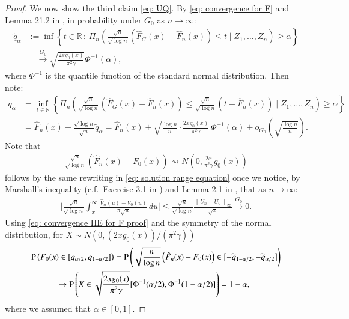 \begin{proof}
		We now show the third claim \eqref{eq: UQ}. By \eqref{eq: convergence for F} and Lemma 21.2 in \cite{6}, in probability under $G_0$ as $n \rightarrow \infty$:
	\begin{align*}
		\widetilde{q}_{\alpha} &:= \inf \left\{ t \in \mathbb{R} \, : \, \Pi_n \left( \frac{\sqrt{n}}{\sqrt{\log n}}\left(\hat{F}_{\scriptscriptstyle{G}}(x)-\hat{F}_n(x)\right) \leq t \mid Z_1, \ldots, Z_n \right) \geq \alpha \right\} \\
		&\quad \stackrel{G_0}{\longrightarrow} \sqrt{\frac{2 x g_0(x)}{\pi^2 \gamma}} \Phi^{-1}(\alpha), 
	\end{align*}
	where $\Phi^{-1}$ is the quantile function of the standard normal distribution. Then note:
	\begin{align*}
		q_{\alpha} &= \inf_{t \in \mathbb{R}} \left\{  \Pi_n \left( \frac{\sqrt{n}}{\sqrt{\log n}}\left(\hat{F}_{\scriptscriptstyle{G}}(x)-\hat{F}_n(x)\right) \leq \frac{\sqrt{n}}{\sqrt{\log n}} \left( t - \hat{F}_n(x) \right)\mid Z_1, \ldots, Z_n \right) \geq \alpha \right\} \\
		&= \hat{F}_n(x) + \frac{\sqrt{\log n}}{\sqrt{n}} \widetilde{q}_{\alpha} = \hat{F}_n(x) +  \sqrt{\frac{\log{n}}{n} \cdot \frac{2 x g_0(x)}{\pi^2 \gamma} } \, \Phi^{-1}(\alpha) + o_{\scriptscriptstyle{G_0}}\left(\sqrt{\frac{\log n}{n}}\right).
	\end{align*}
	 Note that
    \begin{align}\label{eq: convergence IIE for F proof}
	\frac{\sqrt{n}}{\sqrt{\log n}}\left(\hat{F}_n(x) - F_0(x)\right) \rightsquigarrow N\left(0, \frac{2 x}{\pi^2 \gamma} g_0(x)\right)
    \end{align}
    follows by the same rewriting in \eqref{eq: solution range equation} once we notice, by Marshall's inequality (c.f.\ Exercise 3.1 in \cite{2}) and Lemma 2.1 in \cite{27}, that as $n \rightarrow \infty$:
		\begin{align*}
			\bigg| \frac{\sqrt{n}}{\sqrt{\log{n}}} \int_{x}^{\infty} \frac{\hat{V}_n(u)- V_0(u)}{\pi \sqrt{u}} \, du \bigg| \leq \frac{\sqrt{n}}{\sqrt{\log{n}}} \frac{\left\|U_n - U_0\right\|_{\infty}}{\sqrt{x}} \stackrel{G_0}{\longrightarrow} 0.
		\end{align*}
	Using \eqref{eq: convergence IIE for F proof} and the symmetry of the normal distribution, for $X \sim N(0, (2 x g_0(x))/ (\pi^2 \gamma))$ 
	\begin{align*}
		&\mathrm{P} \left( F_0(x) \in [q_{\alpha/2}, q_{1- \alpha/2}]\right) = \mathrm{P} \left( \sqrt{\frac{n}{\log{n}}} \left( \hat{F}_n(x)- F_0(x) \right) \in \left[-\widetilde{q}_{1-\alpha/2}, -\widetilde{q}_{\alpha/2} \right]  \right)\\
		&\quad \quad \quad \rightarrow \mathrm{P} \left( X \in \sqrt{ \frac{2 x g_0(x)}{\pi^2 \gamma} } [\Phi^{-1}(\alpha/2), \Phi^{-1}(1-\alpha/2)]\right) = 1 - \alpha,
	\end{align*}
	where we assumed that $\alpha \in [0,1]$.
	\end{proof}


